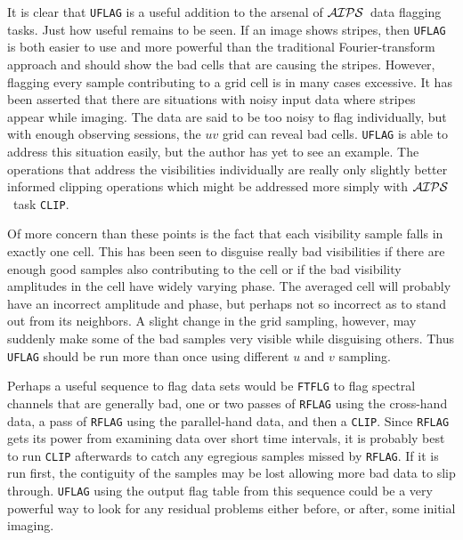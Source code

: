 \documentclass[twoside]{article}
\newcommand{\AIPS}{{$\cal AIPS\/$}}
\begin{document}
It is clear that {\tt UFLAG} is a useful addition to the arsenal of
\AIPS\ data flagging tasks.  Just how useful remains to be seen.  If
an image shows stripes, then {\tt UFLAG} is both easier to use and
more powerful than the traditional Fourier-transform approach and
should show the bad cells that are causing the stripes.  However,
flagging every sample contributing to a grid cell is in many cases
excessive.  It has been asserted that there are situations with noisy
input data where stripes appear while imaging.  The data are said to
be too noisy to flag individually, but with enough observing sessions,
the $uv$ grid can reveal bad cells.  {\tt UFLAG} is able to address
this situation easily, but the author has yet to see an example.  The
operations that address the visibilities individually are really only
slightly better informed clipping operations which might be addressed
more simply with \AIPS\ task {\tt CLIP}\@.

Of more concern than these points is the fact that each visibility
sample falls in exactly one cell.  This has been seen to disguise
really bad visibilities if there are enough good samples also
contributing to the cell or if the bad visibility amplitudes in the
cell have widely varying phase.  The averaged cell will probably have
an incorrect amplitude and phase, but perhaps not so incorrect as to
stand out from its neighbors.  A slight change in the grid sampling,
however, may suddenly make some of the bad samples very visible while
disguising others.  Thus {\tt UFLAG} should be run more than once
using different $u$ and $v$ sampling.

Perhaps a useful sequence to flag data sets would be {\tt FTFLG} to
flag spectral channels that are generally bad, one or two passes of
{\tt RFLAG} using the cross-hand data, a pass of {\tt RFLAG} using the
parallel-hand data, and then a {\tt CLIP}\@.  Since {\tt RFLAG} gets
its power from examining data over short time intervals, it is
probably best to run {\tt CLIP} afterwards to catch any egregious
samples missed by {\tt RFLAG}\@.  If it is run first, the contiguity
of the samples may be lost allowing more bad data to slip through.
{\tt UFLAG} using the output flag table from this sequence could be a
very powerful way to look for any residual problems either before, or
after, some initial imaging.
\end{document}
